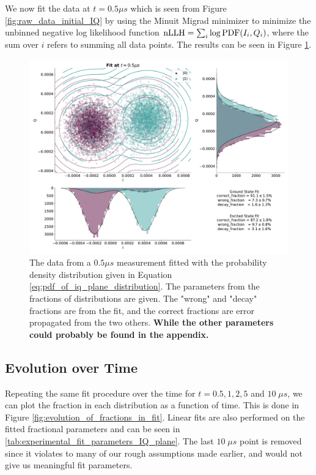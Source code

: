 We now fit the data at $t = 0.5 \mu s$ which is seen from Figure \ref{fig:raw_data_initial_IQ} by using the Minuit Migrad minimizer to minimize the unbinned negative log likelihood function $\operatorname{nLLH} = \sum_i \log \operatorname{PDF}(I_i, Q_i)$, where the sum over $i$ refers to summing all data points. The results can be seen in Figure \ref{fig:fit_0_5_IQ_plane}.

\begin{figure}
    \centering
    \includegraphics{Figs/Results/IQ_plane_initial/fit_0_5.pdf}
    \caption{The data from a $0.5 \mu s$ measurement fitted with the probability density distribution given in Equation \ref{eq:pdf_of_iq_plane_distribution}. The parameters from the fractions of distributions are given. The "wrong" and "decay" fractions are from the fit, and the correct fractions are error propagated from the two others. \textbf{While the other parameters could probably be found in the appendix.}}
    \label{fig:fit_0_5_IQ_plane}
\end{figure}



\subsection{Evolution over Time}
Repeating the same fit procedure over the time for $t = 0.5, 1, 2, 5$ and $10 \; \mu s$, we can plot the fraction in each distribution as a function of time. This is done in Figure \ref{fig:evolution_of_fractions_in_fit}. Linear fits are also performed on the fitted fractional parameters and can be seen in \ref{tab:experimental_fit_parameters_IQ_plane}. The last $10 \; \mu s$ point is removed since it violates to many of our rough assumptions made earlier, and would not give us meaningful fit parameters.

